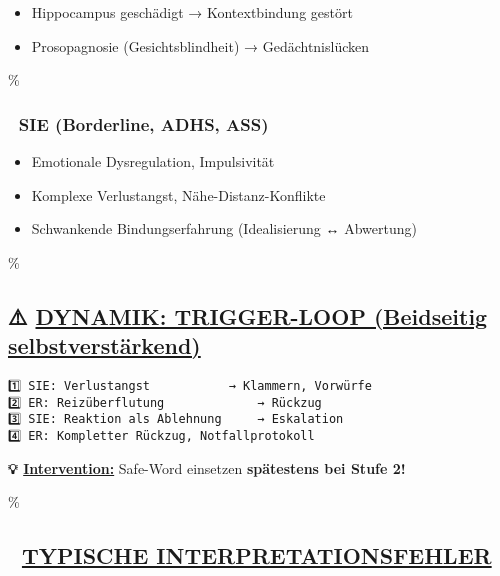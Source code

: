 \begin{itemize}
\tightlist
\item
  Hippocampus geschädigt → Kontextbindung gestört
\item
  Prosopagnosie (Gesichtsblindheit) → Gedächtnislücken
\end{itemize}

\hypertarget{sie-borderline-adhs-ass}{\%
\subsubsection{\texorpdfstring{🔴 \textbf{SIE (Borderline, ADHS, ASS)}}{🔴 SIE (Borderline, ADHS, ASS)}}\label{sie-borderline-adhs-ass}}

\begin{itemize}
\tightlist
\item
  Emotionale Dysregulation, Impulsivität
\item
  Komplexe Verlustangst, Nähe-Distanz-Konflikte
\item
  Schwankende Bindungserfahrung (Idealisierung ↔ Abwertung)
\end{itemize}

\hypertarget{dynamik-trigger-loop-beidseitig-selbstverstuxe4rkend}{\%
\subsection{\texorpdfstring{⚠️ \textbf{\ul{DYNAMIK: TRIGGER-LOOP (Beidseitig selbstverstärkend)}}}{⚠️ DYNAMIK: TRIGGER-LOOP (Beidseitig selbstverstärkend)}}\label{dynamik-trigger-loop-beidseitig-selbstverstuxe4rkend}}

\begin{verbatim}
1️⃣ SIE: Verlustangst 			→ Klammern, Vorwürfe
2️⃣ ER: Reizüberflutung 			→ Rückzug
3️⃣ SIE: Reaktion als Ablehnung 	→ Eskalation
4️⃣ ER: Kompletter Rückzug, Notfallprotokoll
\end{verbatim}

\textbf{💡 \ul{Intervention:}} Safe-Word einsetzen \textbf{spätestens bei Stufe 2!}

\hypertarget{typische-interpretationsfehler}{\%
\subsection{\texorpdfstring{🧠 \textbf{\ul{TYPISCHE INTERPRETATIONSFEHLER}}}{🧠 TYPISCHE INTERPRETATIONSFEHLER}}\label{typische-interpretationsfehler}}

